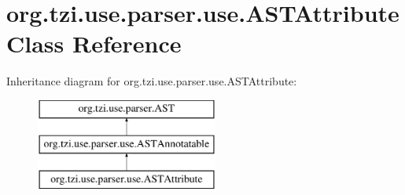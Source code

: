 \hypertarget{classorg_1_1tzi_1_1use_1_1parser_1_1use_1_1_a_s_t_attribute}{\section{org.\-tzi.\-use.\-parser.\-use.\-A\-S\-T\-Attribute Class Reference}
\label{classorg_1_1tzi_1_1use_1_1parser_1_1use_1_1_a_s_t_attribute}
}
Inheritance diagram for org.\-tzi.\-use.\-parser.\-use.\-A\-S\-T\-Attribute\-:\begin{figure}[H]
\begin{center}
\leavevmode
\includegraphics[height=3.000000cm]{classorg_1_1tzi_1_1use_1_1parser_1_1use_1_1_a_s_t_attribute}
\end{center}
\end{figure}
